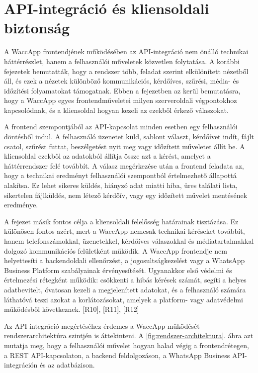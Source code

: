 \chapter{API-integráció és kliensoldali biztonság}

A WaccApp frontendjének működésében az API-integráció nem önálló technikai háttérrészlet, hanem a felhasználói műveletek közvetlen folytatása. A korábbi fejezetek bemutatták, hogy a rendszer több, feladat szerint elkülönített nézetből áll, és ezek a nézetek különböző kommunikációs, kérdőíves, szűrési, média- és időzítési folyamatokat támogatnak. Ebben a fejezetben az kerül bemutatásra, hogy a WaccApp egyes frontendműveletei milyen szerveroldali végpontokhoz kapcsolódnak, és a kliensoldal hogyan kezeli az ezekből érkező válaszokat. 

A frontend szempontjából az API-kapcsolat minden esetben egy felhasználói döntésből indul. A felhasználó üzenetet küld, sablont választ, kérdőívet indít, fájlt csatol, szűrést futtat, beszélgetést nyit meg vagy időzített műveletet állít be. A kliensoldal ezekből az adatokból állítja össze azt a kérést, amelyet a háttérrendszer felé továbbít. A válasz megérkezése után a frontend feladata az, hogy a technikai eredményt felhasználói szempontból értelmezhető állapottá alakítsa. Ez lehet sikeres küldés, hiányzó adat miatti hiba, üres találati lista, sikertelen fájlküldés, nem létező kérdőív, vagy egy időzített művelet mentésének eredménye. 

A fejezet másik fontos célja a kliensoldali felelősség határainak tisztázása. Ez különösen fontos azért, mert a WaccApp nemcsak technikai kéréseket továbbít, hanem telefonszámokkal, üzenetekkel, kérdőíves válaszokkal és médiatartalmakkal dolgozó kommunikációs felületként működik. A WaccApp frontendje nem helyettesíti a backendoldali ellenőrzést, a jogosultságkezelést vagy a WhatsApp Business Platform szabályainak érvényesítését. Ugyanakkor első védelmi és értelmezési rétegként működik: csökkenti a hibás kérések számát, segíti a helyes adatbevitelt, óvatosan kezeli a megjelenített adatokat, és a felhasználó számára láthatóvá teszi azokat a korlátozásokat, amelyek a platform- vagy adatvédelmi működésből következnek. [R10], [R11], [R12]

Az API-integráció megértéséhez érdemes a WaccApp működését rendszerarchitektúra szintjén is áttekinteni. A \ref{fig:rendszer-architektura}. ábra azt mutatja meg, hogy a felhasználói művelet hogyan halad végig a frontendrétegen, a REST API-kapcsolaton, a backend feldolgozáson, a WhatsApp Business API-integráción és az adatbázison.

